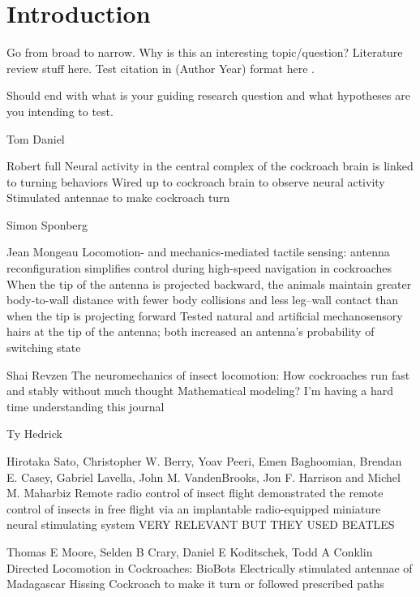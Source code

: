 \section{Introduction}
Go from broad to narrow. Why is this an interesting topic/question? Literature review stuff here. Test citation in (Author Year) format here \citep{buck2020go}. 

Should end with what is your guiding research question and what hypotheses are you intending to test. 







Tom Daniel

Robert full
Neural activity in the central complex of the cockroach brain is linked to turning behaviors 
Wired up to cockroach brain to observe neural activity
Stimulated antennae to make cockroach turn

Simon Sponberg

Jean Mongeau
Locomotion- and mechanics-mediated tactile sensing: antenna reconfiguration simplifies control during high-speed navigation in cockroaches
When the tip of the antenna is projected backward, the animals maintain greater body-to-wall distance with fewer body collisions and less leg–wall contact than when the tip is projecting forward
Tested natural and artificial mechanosensory hairs at the tip of the antenna; both  increased an antenna's probability of switching state

Shai Revzen
The neuromechanics of insect locomotion: How cockroaches run fast and stably without much thought
Mathematical modeling? I’m having a hard time understanding this journal

Ty Hedrick

Hirotaka Sato, Christopher W. Berry, Yoav Peeri, Emen Baghoomian, Brendan E. Casey, Gabriel Lavella, John M. VandenBrooks, Jon F. Harrison and Michel M. Maharbiz
Remote radio control of insect flight
demonstrated the remote control of insects in free flight via an implantable radio-equipped miniature neural stimulating system
VERY RELEVANT BUT THEY USED BEATLES %

Thomas E Moore, Selden B Crary, Daniel E Koditschek, Todd A Conklin
Directed Locomotion in Cockroaches: BioBots
Electrically stimulated antennae of Madagascar Hissing Cockroach to make it turn or followed prescribed paths


